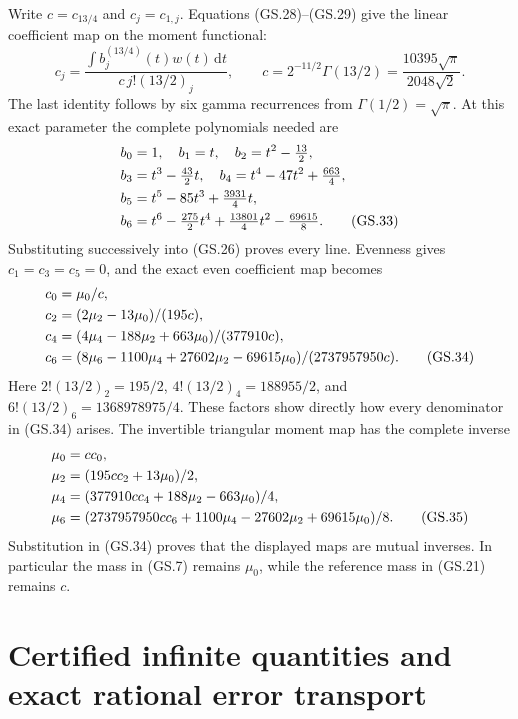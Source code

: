 \documentclass[11pt]{article}
\newcommand{\dd}{\,\mathrm d}
\begin{document}
Write $c=c_{13/4}$ and $c_j=c_{1,j}$. Equations (GS.28)--(GS.29)
give the linear coefficient map on the moment functional:
\begin{equation}
 c_j=\frac{\int b_j^{(13/4)}(t)w(t)\dd t}
 {c\,j!(13/2)_j},\qquad
 c=2^{-11/2}\Gamma(13/2)=\frac{10395\sqrt\pi}{2048\sqrt2}.
 \tag{GS.32}
\end{equation}
The last identity follows by six gamma recurrences from
$\Gamma(1/2)=\sqrt\pi$. At this exact parameter the complete
polynomials needed are
\begin{align}
 b_0&=1,\quad b_1=t,\quad b_2=t^2-\tfrac{13}{2},\notag\\
 b_3&=t^3-\tfrac{43}{2}t,\quad
 b_4=t^4-47t^2+\tfrac{663}{4},\notag\\
 b_5&=t^5-85t^3+\tfrac{3931}{4}t,\notag\\
 b_6&=t^6-\tfrac{275}{2}t^4+\tfrac{13801}{4}t^2-\tfrac{69615}{8}.
 \tag{GS.33}
\end{align}
Substituting successively into (GS.26) proves every line.
Evenness gives $c_1=c_3=c_5=0$, and the exact even coefficient
map becomes
\begin{align}
 c_0&=\mu_0/c,\notag\\
 c_2&=(2\mu_2-13\mu_0)/(195c),\notag\\
 c_4&=(4\mu_4-188\mu_2+663\mu_0)/(377910c),\notag\\
 c_6&=(8\mu_6-1100\mu_4+27602\mu_2-69615\mu_0)/(2737957950c).
 \tag{GS.34}
\end{align}
Here $2!(13/2)_2=195/2$, $4!(13/2)_4=188955/2$,
and $6!(13/2)_6=1368978975/4$. These factors show directly
how every denominator in (GS.34) arises. The invertible triangular
moment map has the complete inverse
\begin{align}
 \mu_0&=c c_0,\notag\\
 \mu_2&=(195c c_2+13\mu_0)/2,\notag\\
 \mu_4&=(377910c c_4+188\mu_2-663\mu_0)/4,\notag\\
 \mu_6&=(2737957950c c_6+1100\mu_4-27602\mu_2+69615\mu_0)/8.
 \tag{GS.35}
\end{align}
Substitution in (GS.34) proves that the displayed maps are mutual
inverses. In particular the mass in (GS.7) remains $\mu_0$,
while the reference mass in (GS.21) remains $c$.

\section{Certified infinite quantities and exact rational error transport}
\end{document}
